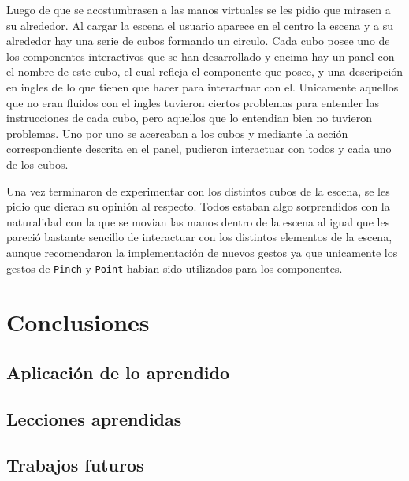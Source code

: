 \documentclass[a4paper, 12pt]{book}
\begin{document}
Luego de que se acostumbrasen a las manos virtuales se les pidio que mirasen a su alrededor. Al cargar la escena el usuario aparece en el centro la escena y a su alrededor hay una serie de cubos formando un circulo. Cada cubo posee uno de los componentes interactivos que se han desarrollado y encima hay un panel con el nombre de este cubo, el cual refleja el componente que posee, y una descripción en ingles de lo que tienen que hacer para interactuar con el.
Unicamente aquellos que no eran fluidos con el ingles tuvieron ciertos problemas para entender las instrucciones de cada cubo, pero aquellos que lo entendian bien no tuvieron problemas. Uno por uno se acercaban a los cubos y mediante la acción correspondiente descrita en el panel, pudieron interactuar con todos y cada uno de los cubos. 

Una vez terminaron de experimentar con los distintos cubos de la escena, se les pidio que dieran su opinión al respecto. Todos estaban algo sorprendidos con la naturalidad con la que se movian las manos dentro de la escena al igual que les pareció bastante sencillo de interactuar con los distintos elementos de la escena, aunque recomendaron la implementación de nuevos gestos ya que unicamente los gestos de \texttt{Pinch} y \texttt{Point} habian sido utilizados para los componentes.

\cleardoublepage
\chapter{Conclusiones}
\label{chap:conclusiones}


\section{Aplicación de lo aprendido}
\label{sec:aplicacion}



\section{Lecciones aprendidas}
\label{sec:lecciones_aprendidas}


\section{Trabajos futuros}
\label{sec:trabajos_futuros}


\cleardoublepage


 
\end{document}
